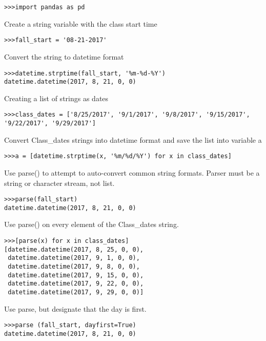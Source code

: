 \begin{verbatim}
>>>import pandas as pd
\end{verbatim}

Create a string variable with the class start time

\begin{verbatim}
>>>fall_start = '08-21-2017'
\end{verbatim}

Convert the string to datetime format

\begin{verbatim}
>>>datetime.strptime(fall_start, '%m-%d-%Y')
datetime.datetime(2017, 8, 21, 0, 0)
\end{verbatim}

Creating a list of strings as dates

\begin{verbatim}
>>>class_dates = ['8/25/2017', '9/1/2017', '9/8/2017', '9/15/2017', '9/22/2017', '9/29/2017']
\end{verbatim}

Convert Class\_dates strings into datetime format and save the list into
variable a

\begin{verbatim}
>>>a = [datetime.strptime(x, '%m/%d/%Y') for x in class_dates]
\end{verbatim}

Use parse() to attempt to auto-convert common string formats. Parser
must be a string or character stream, not list.

\begin{verbatim}
>>>parse(fall_start)
datetime.datetime(2017, 8, 21, 0, 0)
\end{verbatim}

Use parse() on every element of the Class\_dates string.

\begin{verbatim}
>>>[parse(x) for x in class_dates] 
[datetime.datetime(2017, 8, 25, 0, 0),
 datetime.datetime(2017, 9, 1, 0, 0),
 datetime.datetime(2017, 9, 8, 0, 0),
 datetime.datetime(2017, 9, 15, 0, 0),
 datetime.datetime(2017, 9, 22, 0, 0),
 datetime.datetime(2017, 9, 29, 0, 0)]  
\end{verbatim}

Use parse, but designate that the day is first.

\begin{verbatim}
>>>parse (fall_start, dayfirst=True)
datetime.datetime(2017, 8, 21, 0, 0)
\end{verbatim}

